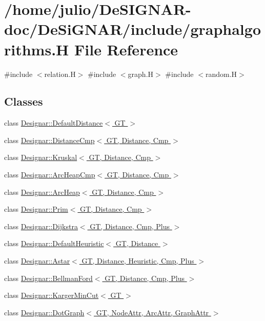 \hypertarget{graphalgorithms_8_h}{}\section{/home/julio/\+De\+S\+I\+G\+N\+A\+R-\/doc/\+De\+Si\+G\+N\+A\+R/include/graphalgorithms.H File Reference}
\label{graphalgorithms_8_h}
{\ttfamily \#include $<$relation.\+H$>$}\newline
{\ttfamily \#include $<$graph.\+H$>$}\newline
{\ttfamily \#include $<$random.\+H$>$}\newline
\subsection*{Classes}
\begin{DoxyCompactItemize}
\item 
class \hyperlink{class_designar_1_1_default_distance}{Designar\+::\+Default\+Distance$<$ G\+T $>$}
\item 
class \hyperlink{class_designar_1_1_distance_cmp}{Designar\+::\+Distance\+Cmp$<$ G\+T, Distance, Cmp $>$}
\item 
class \hyperlink{class_designar_1_1_kruskal}{Designar\+::\+Kruskal$<$ G\+T, Distance, Cmp $>$}
\item 
class \hyperlink{class_designar_1_1_arc_heap_cmp}{Designar\+::\+Arc\+Heap\+Cmp$<$ G\+T, Distance, Cmp $>$}
\item 
class \hyperlink{class_designar_1_1_arc_heap}{Designar\+::\+Arc\+Heap$<$ G\+T, Distance, Cmp $>$}
\item 
class \hyperlink{class_designar_1_1_prim}{Designar\+::\+Prim$<$ G\+T, Distance, Cmp $>$}
\item 
class \hyperlink{class_designar_1_1_dijkstra}{Designar\+::\+Dijkstra$<$ G\+T, Distance, Cmp, Plus $>$}
\item 
class \hyperlink{class_designar_1_1_default_heuristic}{Designar\+::\+Default\+Heuristic$<$ G\+T, Distance $>$}
\item 
class \hyperlink{class_designar_1_1_astar}{Designar\+::\+Astar$<$ G\+T, Distance, Heuristic, Cmp, Plus $>$}
\item 
class \hyperlink{class_designar_1_1_bellman_ford}{Designar\+::\+Bellman\+Ford$<$ G\+T, Distance, Cmp, Plus $>$}
\item 
class \hyperlink{class_designar_1_1_karger_min_cut}{Designar\+::\+Karger\+Min\+Cut$<$ G\+T $>$}
\item 
class \hyperlink{class_designar_1_1_dot_graph}{Designar\+::\+Dot\+Graph$<$ G\+T, Node\+Attr, Arc\+Attr, Graph\+Attr $>$}
\end{DoxyCompactItemize}

